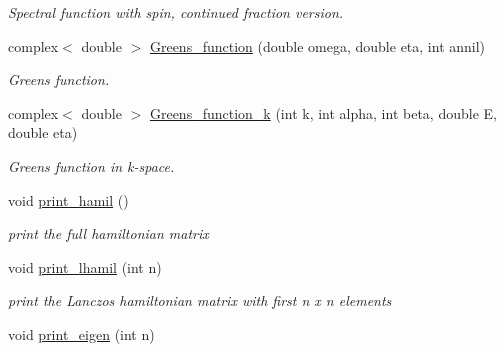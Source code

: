 \begin{DoxyCompactItemize}
\begin{DoxyCompactList}\small\item\em Spectral function with spin, continued fraction version. \end{DoxyCompactList}\item 
complex$<$ double $>$ \hyperlink{classlhamil_a657968fcec5a5231726184b2817eb8f6}{Greens\+\_\+function} (double omega, double eta, int annil)\hypertarget{classlhamil_a657968fcec5a5231726184b2817eb8f6}{}\label{classlhamil_a657968fcec5a5231726184b2817eb8f6}

\begin{DoxyCompactList}\small\item\em Green\textquotesingle{}s function. \end{DoxyCompactList}\item 
complex$<$ double $>$ \hyperlink{classlhamil_a22e29163bcb08ab415f3814490926d5c}{Greens\+\_\+function\+\_\+k} (int k, int alpha, int beta, double E, double eta)\hypertarget{classlhamil_a22e29163bcb08ab415f3814490926d5c}{}\label{classlhamil_a22e29163bcb08ab415f3814490926d5c}

\begin{DoxyCompactList}\small\item\em Green\textquotesingle{}s function in k-\/space. \end{DoxyCompactList}\item 
void \hyperlink{classlhamil_ad4fb3d36c5dc5def8509f0a26d400579}{print\+\_\+hamil} ()\hypertarget{classlhamil_ad4fb3d36c5dc5def8509f0a26d400579}{}\label{classlhamil_ad4fb3d36c5dc5def8509f0a26d400579}

\begin{DoxyCompactList}\small\item\em print the full hamiltonian matrix \end{DoxyCompactList}\item 
void \hyperlink{classlhamil_a88e4fa99cf2905aec1301781a1b9cb4d}{print\+\_\+lhamil} (int n)\hypertarget{classlhamil_a88e4fa99cf2905aec1301781a1b9cb4d}{}\label{classlhamil_a88e4fa99cf2905aec1301781a1b9cb4d}

\begin{DoxyCompactList}\small\item\em print the Lanczos hamiltonian matrix with first n x n elements \end{DoxyCompactList}\item 
void \hyperlink{classlhamil_a34d0966a2d370ef1140f5246648e8f65}{print\+\_\+eigen} (int n)\hypertarget{classlhamil_a34d0966a2d370ef1140f5246648e8f65}{}\label{classlhamil_a34d0966a2d370ef1140f5246648e8f65}


\end{DoxyCompactItemize}
